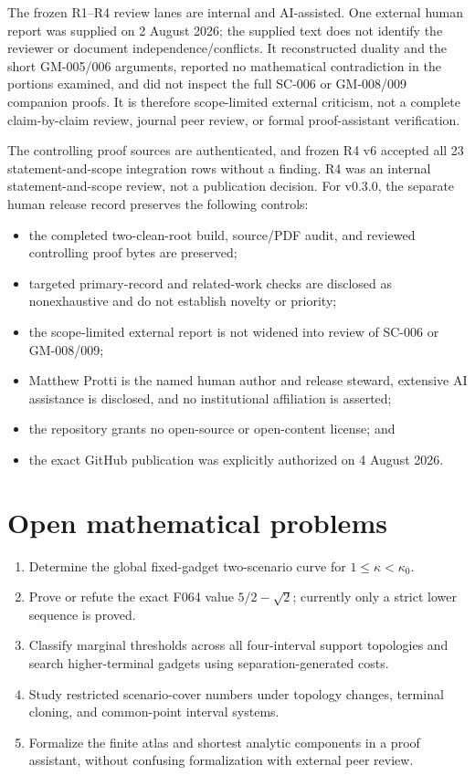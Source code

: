 \documentclass[11pt]{article}
\theoremstyle{remark}
\begin{document}
The frozen R1--R4 review lanes are internal and AI-assisted. One external human
report was supplied on 2 August 2026; the supplied text does not identify the
reviewer or document independence/conflicts. It reconstructed duality and the
short GM-005/006 arguments, reported no mathematical contradiction in the
portions examined, and did not inspect the full SC-006 or GM-008/009 companion
proofs. It is therefore scope-limited external criticism, not a complete
claim-by-claim review, journal peer review, or formal proof-assistant
verification.

The controlling proof sources are authenticated, and frozen R4 v6 accepted
all 23 statement-and-scope integration rows without a finding. R4 was an
internal statement-and-scope review, not a publication decision. For v0.3.0,
the separate human release record preserves the following controls:

\begin{itemize}[leftmargin=2em]
\item the completed two-clean-root build, source/PDF audit, and reviewed
controlling proof bytes are preserved;
\item targeted primary-record and related-work checks are disclosed as
nonexhaustive and do not establish novelty or priority;
\item the scope-limited external report is not widened into review of SC-006
or GM-008/009;
\item Matthew Protti is the named human author and release steward, extensive
AI assistance is disclosed, and no institutional affiliation is asserted;
\item the repository grants no open-source or open-content license; and
\item the exact GitHub publication was explicitly authorized on 4 August 2026.
\end{itemize}

\section{Open mathematical problems}

\begin{enumerate}[leftmargin=2em]
\item Determine the global fixed-gadget two-scenario curve for
$1\le\kappa<\kappa_0$.
\item Prove or refute the exact F064 value $5/2-\sqrt2$; currently only a
strict lower sequence is proved.
\item Classify marginal thresholds across all four-interval support
topologies and search higher-terminal gadgets using separation-generated
costs.
\item Study restricted scenario-cover numbers under topology changes,
terminal cloning, and common-point interval systems.
\item Formalize the finite atlas and shortest analytic components in a proof
assistant, without confusing formalization with external peer review.
\end{enumerate}
\end{document}
